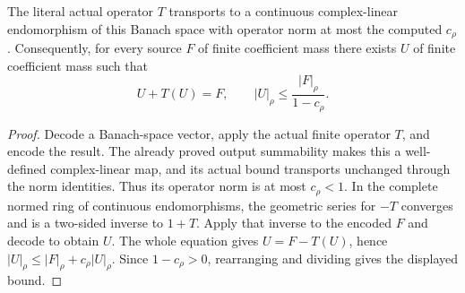 \begin{theorem}
\label{hir:actual-vertex-tail-neumann-solution}
\leanok
The literal actual operator $T$ transports to a continuous complex-linear endomorphism of this Banach space with operator norm at most the computed $c_\rho$. Consequently, for every source $F$ of finite coefficient mass there exists $U$ of finite coefficient mass such that
\[
 U+T(U)=F,
 \qquad |U|_\rho\le\frac{|F|_\rho}{1-c_\rho}.
\]
\end{theorem}
\begin{proof}
Decode a Banach-space vector, apply the actual finite operator $T$, and encode the result. The already proved output summability makes this a well-defined complex-linear map, and its actual bound transports unchanged through the norm identities. Thus its operator norm is at most $c_\rho<1$. In the complete normed ring of continuous endomorphisms, the geometric series for $-T$ converges and is a two-sided inverse to $1+T$. Apply that inverse to the encoded $F$ and decode to obtain $U$. The whole equation gives $U=F-T(U)$, hence $|U|_\rho\le |F|_\rho+c_\rho|U|_\rho$. Since $1-c_\rho>0$, rearranging and dividing gives the displayed bound.
\end{proof}

